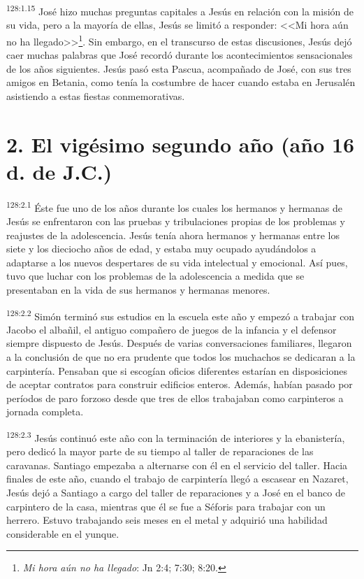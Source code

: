 \par 
\textsuperscript{128:1.15} José hizo muchas preguntas capitales a Jesús en relación con la misión de su vida, pero a la mayoría de ellas, Jesús se limitó a responder: <<Mi hora aún no ha llegado>>\footnote{\textit{Mi hora aún no ha llegado}: Jn 2:4; 7:30; 8:20.}. Sin embargo, en el transcurso de estas discusiones, Jesús dejó caer muchas palabras que José recordó durante los acontecimientos sensacionales de los años siguientes. Jesús pasó esta Pascua, acompañado de José, con sus tres amigos en Betania, como tenía la costumbre de hacer cuando estaba en Jerusalén asistiendo a estas fiestas conmemorativas.

\section*{2. El vigésimo segundo año (año 16 d. de J.C.)}
\par 
\textsuperscript{128:2.1} Éste fue uno de los años durante los cuales los hermanos y hermanas de Jesús se enfrentaron con las pruebas y tribulaciones propias de los problemas y reajustes de la adolescencia. Jesús tenía ahora hermanos y hermanas entre los siete y los dieciocho años de edad, y estaba muy ocupado ayudándolos a adaptarse a los nuevos despertares de su vida intelectual y emocional. Así pues, tuvo que luchar con los problemas de la adolescencia a medida que se presentaban en la vida de sus hermanos y hermanas menores.

\par 
\textsuperscript{128:2.2} Simón terminó sus estudios en la escuela este año y empezó a trabajar con Jacobo el albañil, el antiguo compañero de juegos de la infancia y el defensor siempre dispuesto de Jesús. Después de varias conversaciones familiares, llegaron a la conclusión de que no era prudente que todos los muchachos se dedicaran a la carpintería. Pensaban que si escogían oficios diferentes estarían en disposiciones de aceptar contratos para construir edificios enteros. Además, habían pasado por períodos de paro forzoso desde que tres de ellos trabajaban como carpinteros a jornada completa.

\par 
\textsuperscript{128:2.3} Jesús continuó este año con la terminación de interiores y la ebanistería, pero dedicó la mayor parte de su tiempo al taller de reparaciones de las caravanas. Santiago empezaba a alternarse con él en el servicio del taller. Hacia finales de este año, cuando el trabajo de carpintería llegó a escasear en Nazaret, Jesús dejó a Santiago a cargo del taller de reparaciones y a José en el banco de carpintero de la casa, mientras que él se fue a Séforis para trabajar con un herrero. Estuvo trabajando seis meses en el metal y adquirió una habilidad considerable en el yunque.


